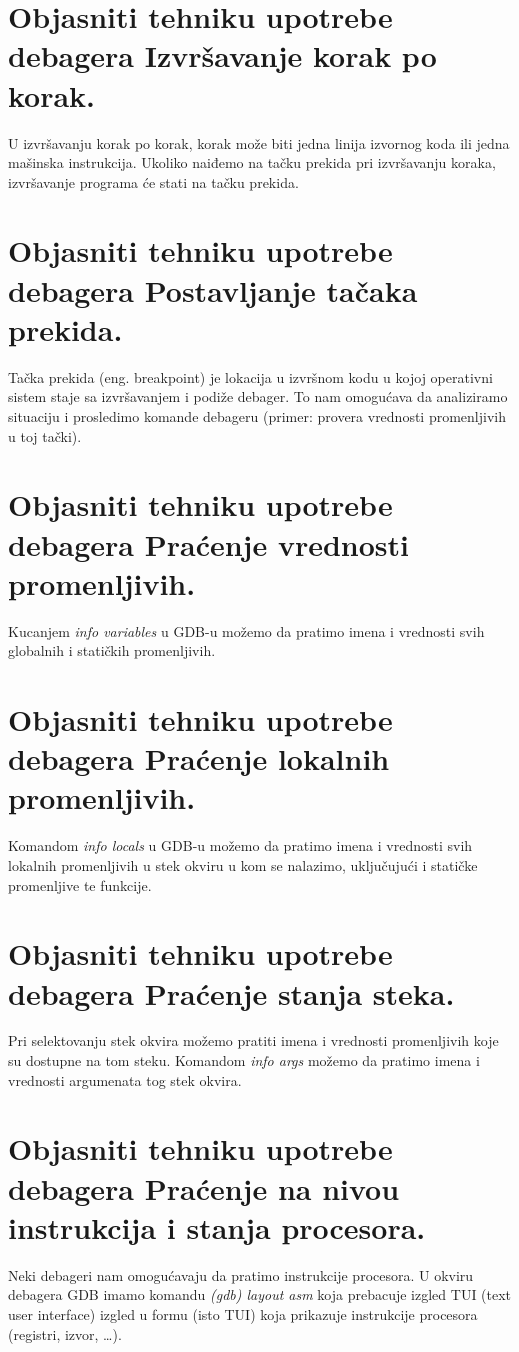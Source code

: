 \documentclass[a4paper]{article}
\begin{document}
\section{Objasniti tehniku upotrebe debagera Izvršavanje korak po korak.}
  U izvršavanju korak po korak, korak može biti jedna linija izvornog koda ili jedna mašinska 
  instrukcija. Ukoliko naiđemo na tačku prekida pri izvršavanju koraka, izvršavanje programa će 
  stati na tačku prekida.

\section{Objasniti tehniku upotrebe debagera Postavljanje tačaka prekida.}
  Tačka prekida (eng. breakpoint) je lokacija u izvršnom kodu u kojoj operativni sistem staje 
  sa izvršavanjem i podiže debager. To nam omogućava da analiziramo situaciju i 
  prosledimo komande debageru (primer: provera vrednosti promenljivih u toj tački).

\section{Objasniti tehniku upotrebe debagera Praćenje vrednosti promenljivih.}
  Kucanjem \textit{info variables} u GDB-u možemo da pratimo imena i vrednosti svih globalnih i 
  statičkih promenljivih.

\section{Objasniti tehniku upotrebe debagera Praćenje lokalnih promenljivih.}
  Komandom \textit{info locals} u GDB-u možemo da pratimo imena i vrednosti svih lokalnih 
  promenljivih u stek okviru u kom se nalazimo, uključujući i statičke promenljive te funkcije.

\section{Objasniti tehniku upotrebe debagera Praćenje stanja steka.}
  Pri selektovanju stek okvira možemo pratiti imena i vrednosti 
  promenljivih koje su dostupne na tom steku. Komandom \textit{info args} možemo 
  da pratimo imena i vrednosti argumenata tog stek okvira.

\section{Objasniti tehniku upotrebe debagera Praćenje na nivou instrukcija i stanja procesora.}
  Neki debageri nam omogućavaju da pratimo instrukcije procesora. U okviru debagera GDB imamo komandu 
  \textit{(gdb) layout asm} koja prebacuje izgled TUI (text user interface) izgled u formu (isto TUI)
  koja prikazuje instrukcije procesora (registri, izvor, \dots). \cite{gdb_commands}
\end{document}
